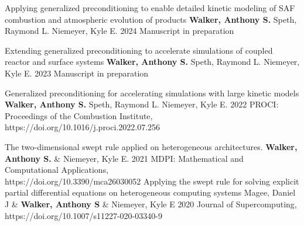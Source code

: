 \documentclass[lighthipster]{simplehipstercv}
\begin{document}
\begin{paracol}{2}
\publication
{Applying generalized preconditioning to enable detailed kinetic modeling of SAF combustion and atmospheric evolution of products}
{\textbf{Walker, Anthony S.} Speth, Raymond L. Niemeyer, Kyle E.}
{2024}
{Manuscript in preparation}
{}

\publication
{Extending generalized preconditioning to accelerate simulations of coupled reactor and surface systems}
{\textbf{Walker, Anthony S.} Speth, Raymond L. Niemeyer, Kyle E.}
{2023}
{Manuscript in preparation}
{}

\publication
{Generalized preconditioning for accelerating simulations with large kinetic models}
{\textbf{Walker, Anthony S.} Speth, Raymond L. Niemeyer, Kyle E.}
{2022}
{PROCI: Proceedings of the Combustion Institute,\\https://doi.org/10.1016/j.proci.2022.07.256}
{}

\publication
{The two-dimensional swept rule applied on heterogeneous architectures.} %
{\textbf{Walker, Anthony S.} \& Niemeyer,  Kyle E.} %
{2021} %
{MDPI: Mathematical and Computational Applications,\\ https://doi.org/10.3390/mca26030052} %
{} %
\publication
{Applying the swept rule for solving explicit partial differential equations on heterogeneous computing systems} %
{Magee, Daniel J \& \textbf{Walker, Anthony S} \& Niemeyer, Kyle E} %
{2020} %
{Journal of Supercomputing,\\ https://doi.org/10.1007/s11227-020-03340-9} %
{\color{black}} %








\end{paracol}
\end{document}
